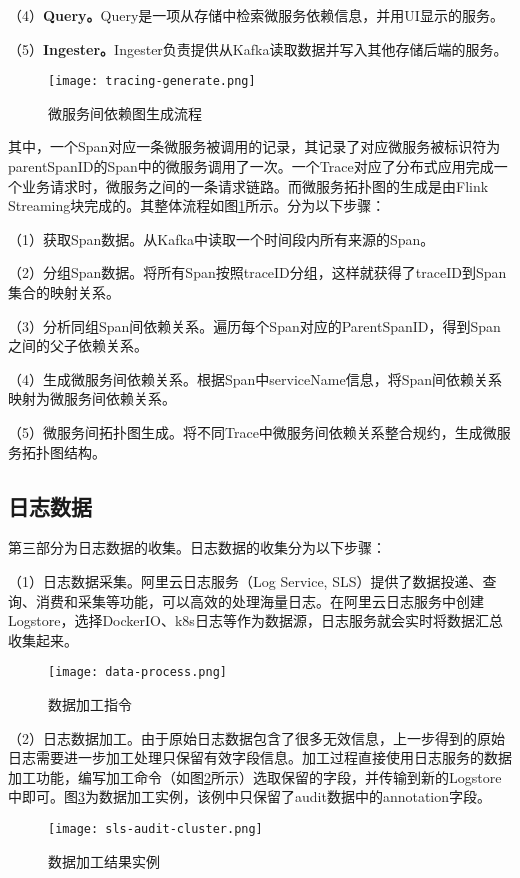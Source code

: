 （4）\textbf{Query。}Query是一项从存储中检索微服务依赖信息，并用UI显示的服务。

（5）\textbf{Ingester。}Ingester负责提供从Kafka读取数据并写入其他存储后端的服务。
\begin{figure}[htbp]
    \centering
    \texttt{[image: tracing-generate.png]}
    \caption{微服务间依赖图生成流程\label{tracing-generate}}
\end{figure}

其中，一个Span对应一条微服务被调用的记录，其记录了对应微服务被标识符为parentSpanID的Span中的微服务调用了一次。一个Trace对应了分布式应用完成一个业务请求时，微服务之间的一条请求链路。而微服务拓扑图的生成是由Flink Streaming块完成的。其整体流程如图\ref{tracing-generate}所示。分为以下步骤：

（1）获取Span数据。从Kafka中读取一个时间段内所有来源的Span。

（2）分组Span数据。将所有Span按照traceID分组，这样就获得了traceID到Span集合的映射关系。

（3）分析同组Span间依赖关系。遍历每个Span对应的ParentSpanID，得到Span之间的父子依赖关系。

（4）生成微服务间依赖关系。根据Span中serviceName信息，将Span间依赖关系映射为微服务间依赖关系。

（5）微服务间拓扑图生成。将不同Trace中微服务间依赖关系整合规约，生成微服务拓扑图结构。

\subsection{日志数据}
第三部分为日志数据的收集。日志数据的收集分为以下步骤：

（1）日志数据采集。阿里云日志服务（Log Service, SLS）提供了数据投递、查询、消费和采集等功能，可以高效的处理海量日志。在阿里云日志服务中创建Logstore，选择DockerIO、k8s日志等作为数据源，日志服务就会实时将数据汇总收集起来。
\begin{figure}[htbp]
    \centering
    \texttt{[image: data-process.png]}
    \caption{数据加工指令\label{data-process}}
\end{figure}

（2）日志数据加工。由于原始日志数据包含了很多无效信息，上一步得到的原始日志需要进一步加工处理只保留有效字段信息。加工过程直接使用日志服务的数据加工功能，编写加工命令（如图\ref{data-process}所示）选取保留的字段，并传输到新的Logstore中即可。图\ref{sls-audit-cluster}为数据加工实例，该例中只保留了audit数据中的annotation字段。

\begin{figure}[htbp]
    \centering
    \texttt{[image: sls-audit-cluster.png]}
    \caption{数据加工结果实例\label{sls-audit-cluster}}
\end{figure}

